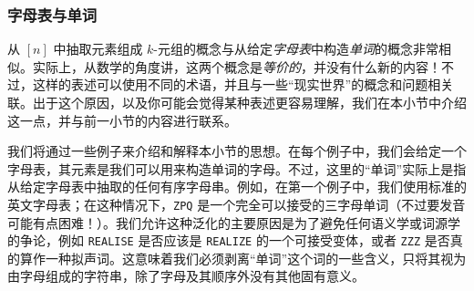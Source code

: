 \subsubsection*{字母表与单词}

从 $[n]$ 中抽取元素组成 $k$-元组的概念与从给定\emph{字母表}中构造\emph{单词}的概念非常相似。实际上，从数学的角度讲，这两个概念是\emph{等价的}，并没有什么新的内容！不过，这样的表述可以使用不同的术语，并且与一些``现实世界''的概念和问题相关联。出于这个原因，以及你可能会觉得某种表述更容易理解，我们在本小节中介绍这一点，并与前一小节的内容进行联系。

我们将通过一些例子来介绍和解释本小节的思想。在每个例子中，我们会给定一个字母表，其元素是我们可以用来构造单词的字母。不过，这里的``单词''实际上是指从给定字母表中抽取的任何有序字母串。例如，在第一个例子中，我们使用标准的英文字母表；在这种情况下，\verb|ZPQ| 是一个完全可以接受的三字母单词（不过要发音可能有点困难！）。我们允许这种泛化的主要原因是为了避免任何语义学或词源学的争论，例如 \verb|REALISE| 是否应该是 \verb|REALIZE| 的一个可接受变体，或者 \verb|ZZZ| 是否真的算作一种拟声词。这意味着我们必须剥离``单词''这个词的一些含义，只将其视为由字母组成的字符串，除了字母及其顺序外没有其他固有意义。

